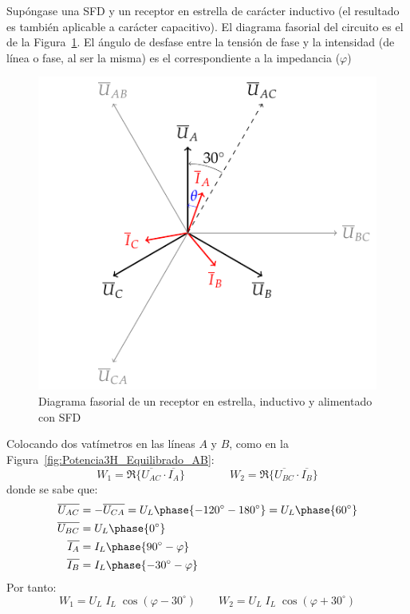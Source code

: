 	Supóngase una SFD y un receptor en estrella de carácter inductivo (el resultado es también aplicable a carácter capacitivo). El diagrama fasorial del circuito es el de la Figura~\ref{fig:fasores_potencia3H}. El ángulo de desfase entre la tensión de fase y la intensidad (de línea o fase, al ser la misma) es el correspondiente a la impedancia ($\varphi$)
	\begin{figure}[H]
	    \centering
	    \includegraphics{../figs/fasores_potencia3H.pdf}
	    \caption{Diagrama fasorial de un receptor en estrella, inductivo y alimentado con SFD}
	    \label{fig:fasores_potencia3H}
	\end{figure}
	
	Colocando dos vatímetros en las líneas $A$ y $B$, como en la Figura~\ref{fig:Potencia3H_Equilibrado_AB}:
	\begin{equation*}
	    W_1=\Re\{\overline{U_{AC}} \cdot \overline{I_A}\}\qquad\qquad W_2=\Re\{\overline{U_{BC}} \cdot \overline{I_B}\}
	\end{equation*}
	donde se sabe que:
	\begin{align*} \overline{U_{AC}}&=-\overline{U_{CA}}=U_L\phase{-120^\circ-180^\circ}=U_L\phase{60^\circ}\\ \overline{U_{BC}}&=U_L\phase{0^\circ}\\ \overline{I_A}&=I_L\phase{90^\circ-\varphi}\\ \overline{I_B}&=I_L\phase{-30^\circ-\varphi} 
	\end{align*}
	Por tanto: 
	\begin{equation*}
	    W_1=U_L\;I_L\;\cos{(\varphi-30^\circ)}\qquad W_2={U_L}\; {I_L}\;\cos{(\varphi+30^\circ)}
	\end{equation*}
	
